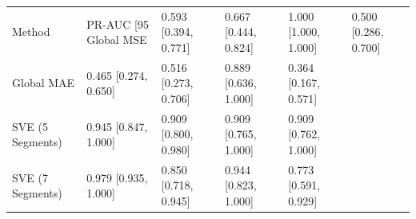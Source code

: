 \begin{tabular}{lllll}
\toprule
Method & PR-AUC [95%
\midrule
Global MSE & 0.593 [0.394, 0.771] & 0.667 [0.444, 0.824] & 1.000 [1.000, 1.000] & 0.500 [0.286, 0.700] \\
Global MAE & 0.465 [0.274, 0.650] & 0.516 [0.273, 0.706] & 0.889 [0.636, 1.000] & 0.364 [0.167, 0.571] \\
SVE (5 Segments) & 0.945 [0.847, 1.000] & 0.909 [0.800, 0.980] & 0.909 [0.765, 1.000] & 0.909 [0.762, 1.000] \\
SVE (7 Segments) & 0.979 [0.935, 1.000] & 0.850 [0.718, 0.945] & 0.944 [0.823, 1.000] & 0.773 [0.591, 0.929] \\
\bottomrule
\end{tabular}
